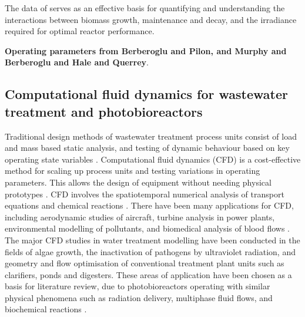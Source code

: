 The data of \cite{Minkevich2004} serves as an effective basis for quantifying and understanding the interactions between biomass growth, maintenance and decay, and the irradiance required for optimal reactor performance.

\textbf{Operating parameters from Berberoglu and Pilon, and Murphy and Berberoglu and Hale and Querrey}.


\subsection{Computational fluid dynamics for wastewater treatment and photobioreactors}
Traditional design methods of wastewater treatment process units consist of load and mass based static analysis, and testing of dynamic behaviour based on key operating state variables \cite{Gaden2013}. Computational fluid dynamics (CFD) is a cost-effective method for scaling up process units and testing variations in operating parameters. This allows the design of equipment without needing physical prototypes \cite{Wood1995}. CFD involves the spatiotemporal numerical analysis of transport equations and chemical reactions \cite{versteeg2007}. There have been many applications for CFD, including aerodynamic studies of aircraft, turbine analysis in power plants, environmental modelling of pollutants, and biomedical analysis of blood flows \cite{Versteeg1995}. The major CFD studies in water treatment modelling have been conducted in the fields of algae growth, the inactivation of pathogens by ultraviolet radiation, and geometry and flow optimisation of conventional treatment plant units such as clarifiers, ponds and digesters. These areas of application have been chosen as a basis for literature review, due to photobioreactors operating with similar physical phenomena such as radiation delivery, multiphase fluid flows, and biochemical reactions \cite{Bitog2011}. 


